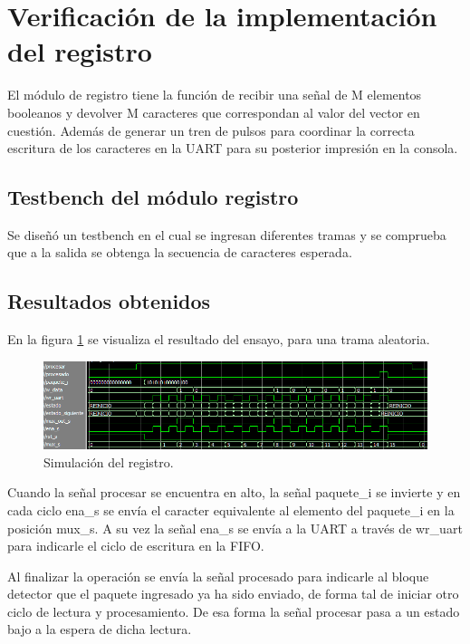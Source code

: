 \section{Verificación de la implementación del registro}

	El módulo de registro tiene la función de recibir una señal de M elementos booleanos y devolver M caracteres que correspondan al valor del vector en cuestión. Además de generar un tren de pulsos para coordinar la correcta escritura de los caracteres en la UART para su posterior impresión en la consola.
	
	\subsection{Testbench del módulo registro}
			
		Se diseñó un testbench en el cual se ingresan diferentes tramas y se comprueba que a la salida se obtenga la secuencia de caracteres esperada.		
			
	\subsection{Resultados obtenidos}
				
		En la figura \ref{fig:Test_Registro} se visualiza el resultado del ensayo, para una trama aleatoria.
		
	\begin{figure}[h]
	\centering
	\includegraphics[scale=0.6]{./Figures/Test/Registro}
		\caption{Simulación del registro.}
		\label{fig:Test_Registro}
	\end{figure}
	
	Cuando la señal procesar se encuentra en alto, la señal paquete\_i se invierte y en cada ciclo ena\_s se envía el caracter equivalente al elemento del paquete\_i en la posición mux\_s. A su vez la señal ena\_s se envía a la UART a través de wr\_uart para indicarle el ciclo de escritura en la FIFO.
	
	Al finalizar la operación se envía la señal procesado para indicarle al bloque detector que el paquete ingresado ya ha sido enviado, de forma tal de iniciar otro ciclo de lectura y procesamiento. De esa forma la señal procesar pasa a un estado bajo a la espera de dicha lectura.
	

